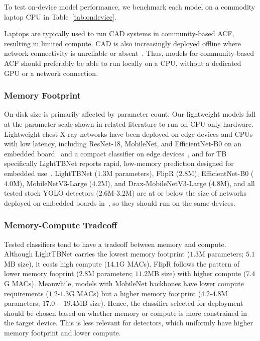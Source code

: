 \documentclass[conference, letterpaper]{IEEEtran}
\begin{document}
To test on-device model performance, we benchmark each model on a commodity laptop CPU in Table~\ref{tab:ondevice}.

Laptops are typically used to run CAD systems in community-based ACF, resulting in limited compute. CAD is also increasingly deployed offline where network connectivity is unreliable or absent~\cite{stoptb_ultraportable, stoptb_cad_guide, min2025scanned}. Thus, models for community-based ACF should preferably be able to run locally on a CPU, without a dedicated GPU or a network connection.

\subsubsection{Memory Footprint}

On-disk size is primarily affected by parameter count. Our lightweight models fall at the parameter scale shown in related literature to run on CPU-only hardware. Lightweight chest X-ray networks have been deployed on edge devices and CPUs with low latency, including ResNet-18, MobileNet, and EfficientNet-B0 on an embedded board~\cite{benmalek2025edge} and a compact classifier on edge devices~\cite{chauhan2024covid_edge}, and for TB specifically LightTBNet reports rapid, low-memory prediction designed for embedded use~\cite{capellan2023lighttbnet}. LightTBNet ($1.3$M parameters), FlipR ($2.8$M), EfficientNet-B0 ($4.0$M), MobileNetV3-Large ($4.2$M), and Drax-MobileNetV3-Large ($4.8$M), and all tested stock YOLO detectors ($2.6\text{M-}3.2$M) are at or below the size of networks deployed on embedded boards in~\cite{benmalek2025edge, chauhan2024covid_edge}, so they should run on the same devices.

\subsubsection{Memory-Compute Tradeoff}

Tested classifiers tend to have a tradeoff between memory and compute. Although LightTBNet carries the lowest memory footprint ($1.3$M parameters; $5.1$MB size), it costs high compute ($14.1$G MACs). FlipR follows the pattern of lower memory fooprint ($2.8$M parameters; $11.2$MB size) with higher compute ($7.4$G MACs). Meanwhile, models with MobileNet backbones have lower compute requirements ($1.2\text{-}1.3$G MACs) but a higher memory footprint ($4.2\text{-}4.8$M parameters; $17.0-19.4$MB size). Hence, the classifier selected for deployment should be chosen based on whether memory or compute is more constrained in the target device. This is less relevant for detectors, which uniformly have higher memory footprint and lower compute.
\end{document}
